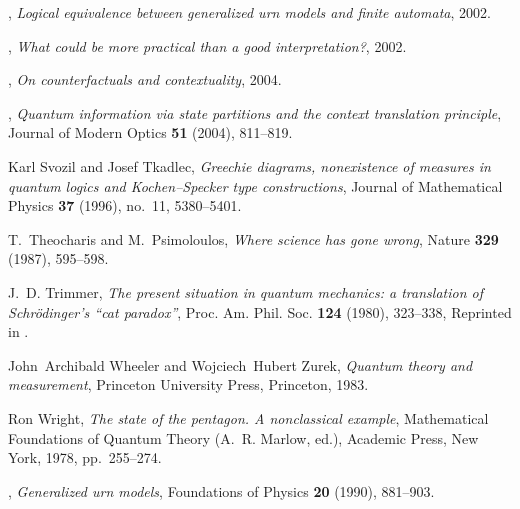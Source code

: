 \documentclass{article}
\begin{document}
\begin{thebibliography}{10}
\bysame, \emph{Logical equivalence between generalized urn models and finite
  automata}, 2002.

\bysame, \emph{What could be more practical than a good interpretation?}, 2002.

\bysame, \emph{On counterfactuals and contextuality}, 2004.

\bysame, \emph{Quantum information via state partitions and the context
  translation principle}, Journal of Modern Optics \textbf{51} (2004),
  811--819.

Karl Svozil and Josef Tkadlec, \emph{Greechie diagrams, nonexistence of
  measures in quantum logics and {K}ochen--{S}pecker type constructions},
  Journal of Mathematical Physics \textbf{37} (1996), no.~11, 5380--5401.

T.~Theocharis and M.~Psimoloulos, \emph{Where science has gone wrong}, Nature
  \textbf{329} (1987), 595--598.

J.~D. Trimmer, \emph{The present situation in quantum mechanics: a translation
  of {S}chr{\"{o}}dinger's ``cat paradox''}, Proc. Am. Phil. Soc. \textbf{124}
  (1980), 323--338, Reprinted in \cite[pp. 152-167]{wheeler-Zurek:83}.

John~Archibald Wheeler and Wojciech~Hubert Zurek, \emph{Quantum theory and
  measurement}, Princeton University Press, Princeton, 1983.

Ron Wright, \emph{The state of the pentagon. {A} nonclassical example},
  Mathematical Foundations of Quantum Theory (A.~R. Marlow, ed.), Academic
  Press, New York, 1978, pp.~255--274.

\bysame, \emph{Generalized urn models}, Foundations of Physics \textbf{20}
  (1990), 881--903.

\end{thebibliography}
\end{document}
